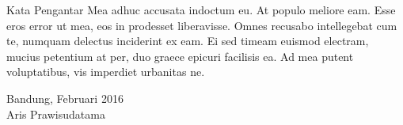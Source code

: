 \documentclass[12pt,a4paper,oneside]{book}
\numberwithin{equation}{chapter}
\begin{document}

\begin{custompage}{Kata Pengantar}
 Mea adhuc accusata indoctum eu. At populo meliore eam. Esse eros error ut mea, eos in prodesset liberavisse. Omnes recusabo intellegebat cum te, numquam delectus inciderint ex eam. Ei sed timeam euismod electram, mucius petentium at per, duo graece epicuri facilisis ea. Ad mea putent voluptatibus, vis imperdiet urbanitas ne.

\begin{flushright}
Bandung, Februari 2016\\[2cm]
Aris Prawisudatama
\end{flushright} 
\end{custompage}

    
\tableofcontents
\newpage\listoftables{}
\newpage\listoffigures{}

\mainmatter





\backmatter


\appendix

\end{document}
